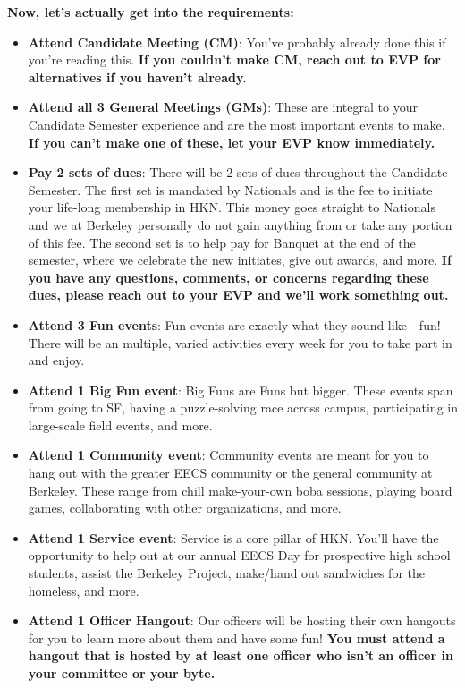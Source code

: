 \documentclass[11pt, article, oneside]{memoir}
\begin{document}
        \textbf{Now, let's actually get into the requirements:}
            \begin{itemize}
                \item \textbf{Attend Candidate Meeting (CM)}: You've probably already done this if you're reading this. \textbf{If you couldn't make CM, reach out to EVP for alternatives if you haven't already.}
                \item \textbf{Attend all 3 General Meetings (GMs)}: These are integral to your Candidate Semester experience and are the most important events to make. \textbf{If you can't make one of these, let your EVP know immediately.}
                \item \textbf{Pay 2 sets of dues}: There will be 2 sets of dues throughout the Candidate Semester. The first set is mandated by Nationals and is the fee to initiate your life-long membership in HKN. This money goes straight to Nationals and we at Berkeley personally do not gain anything from or take any portion of this fee. The second set is to help pay for Banquet at the end of the semester, where we celebrate the new initiates, give out awards, and more. \textbf{If you have any questions, comments, or concerns regarding these dues, please reach out to your EVP and we'll work something out.}
                \item \textbf{Attend 3 Fun events}: Fun events are exactly what they sound like - fun! There will be an multiple, varied activities every week for you to take part in and enjoy.
                \item \textbf{Attend 1 Big Fun event}: Big Funs are Funs but bigger. These events span from going to SF, having a puzzle-solving race across campus, participating in large-scale field events, and more.
                \item \textbf{Attend 1 Community event}: Community events are meant for you to hang out with the greater EECS community or the general community at Berkeley. These range from chill make-your-own boba sessions, playing board games, collaborating with other organizations, and more.
                \item \textbf{Attend 1 Service event}: Service is a core pillar of HKN. You'll have the opportunity to help out at our annual EECS Day for prospective high school students, assist the Berkeley Project, make/hand out sandwiches for the homeless, and more.
                \item \textbf{Attend 1 Officer Hangout}: Our officers will be hosting their own hangouts for you to learn more about them and have some fun! \textbf{You must attend a hangout that is hosted by at least one officer who isn't an officer in your committee or your byte.}

\end{itemize}
\end{document}
